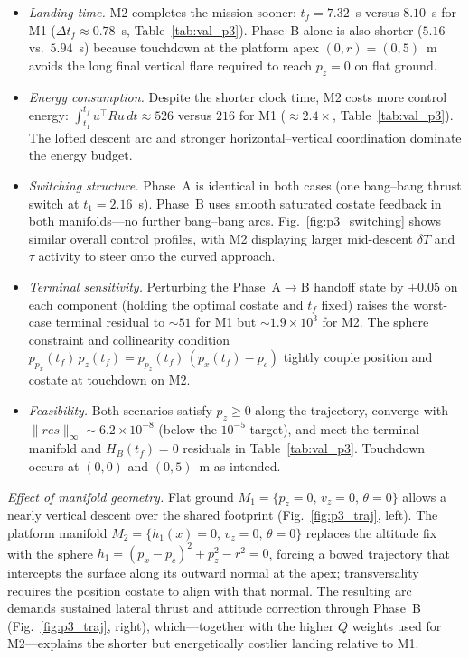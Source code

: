\documentclass[letterpaper, 10 pt, conference]{ieeeconf}
\begin{document}
\begin{itemize}
    \item \textit{Landing time.} M2 completes the mission sooner: $t_f=7.32$~s versus $8.10$~s for M1 ($\Delta t_f\approx0.78$~s, Table~\ref{tab:val_p3}). Phase~B alone is also shorter ($5.16$ vs.\ $5.94$~s) because touchdown at the platform apex $(0,r)=(0,5)$~m avoids the long final vertical flare required to reach $p_z=0$ on flat ground.

    \item \textit{Energy consumption.} Despite the shorter clock time, M2 costs more control energy: $\int_{t_1}^{t_f} u^\top R u\,dt \approx 526$ versus $216$ for M1 ($\approx2.4\times$, Table~\ref{tab:val_p3}). The lofted descent arc and stronger horizontal--vertical coordination dominate the energy budget.

    \item \textit{Switching structure.} Phase~A is identical in both cases (one bang--bang thrust switch at $t_1=2.16$~s). Phase~B uses smooth saturated costate feedback in both manifolds---no further bang--bang arcs. Fig.~\ref{fig:p3_switching} shows similar overall control profiles, with M2 displaying larger mid-descent $\delta T$ and $\tau$ activity to steer onto the curved approach.

    \item \textit{Terminal sensitivity.} Perturbing the Phase~A$\to$B handoff state by $\pm0.05$ on each component (holding the optimal costate and $t_f$ fixed) raises the worst-case terminal residual to $\sim51$ for M1 but $\sim1.9\times10^3$ for M2. The sphere constraint and collinearity condition $p_{p_x}(t_f)\,p_z(t_f)=p_{p_z}(t_f)\,(p_x(t_f)-p_c)$ tightly couple position and costate at touchdown on M2.

    \item \textit{Feasibility.} Both scenarios satisfy $p_z\ge0$ along the trajectory, converge with $\lVert res\rVert_\infty\sim6.2\times10^{-8}$ (below the $10^{-5}$ target), and meet the terminal manifold and $H_B(t_f)=0$ residuals in Table~\ref{tab:val_p3}. Touchdown occurs at $(0,0)$ and $(0,5)$~m as intended.
\end{itemize}

\textit{Effect of manifold geometry.} Flat ground $M_1=\{p_z=0,\,v_z=0,\,\theta=0\}$ allows a nearly vertical descent over the shared footprint (Fig.~\ref{fig:p3_traj}, left). The platform manifold $M_2=\{h_1(x)=0,\,v_z=0,\,\theta=0\}$ replaces the altitude fix with the sphere $h_1=(p_x-p_c)^2+p_z^2-r^2=0$, forcing a bowed trajectory that intercepts the surface along its outward normal at the apex; transversality requires the position costate to align with that normal. The resulting arc demands sustained lateral thrust and attitude correction through Phase~B (Fig.~\ref{fig:p3_traj}, right), which---together with the higher $Q$ weights used for M2---explains the shorter but energetically costlier landing relative to M1.
\end{document}
